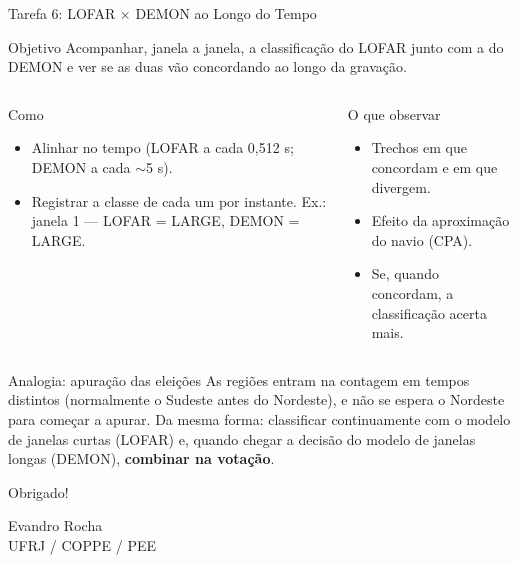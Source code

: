 \documentclass[aspectratio=169]{beamer}
\begin{document}
\begin{frame}{Tarefa 6: LOFAR $\times$ DEMON ao Longo do Tempo}
    \footnotesize
    \begin{block}{\small Objetivo}
        \scriptsize
        Acompanhar, janela a janela, a classificação do LOFAR junto com a do DEMON e ver se as duas vão concordando ao longo da gravação.
    \end{block}

    \begin{columns}[t]
        \begin{block}{\small Como}
            \scriptsize
            \begin{itemize}
                \setlength{\itemsep}{0pt}
                \item Alinhar no tempo (LOFAR a cada 0,512 s; DEMON a cada $\sim$5 s).
                \item Registrar a classe de cada um por instante. Ex.: janela 1 --- LOFAR = LARGE, DEMON = LARGE.
            \end{itemize}
        \end{block}

        \begin{block}{\small O que observar}
            \scriptsize
            \begin{itemize}
                \setlength{\itemsep}{0pt}
                \item Trechos em que concordam e em que divergem.
                \item Efeito da aproximação do navio (CPA).
                \item Se, quando concordam, a classificação acerta mais.
            \end{itemize}
        \end{block}
    \end{columns}

    \begin{alertblock}{\small Analogia: apuração das eleições}
        \scriptsize
        As regiões entram na contagem em tempos distintos (normalmente o Sudeste antes do Nordeste), e não se espera o Nordeste para começar a apurar. Da mesma forma: classificar continuamente com o modelo de janelas curtas (LOFAR) e, quando chegar a decisão do modelo de janelas longas (DEMON), \textbf{combinar na votação}.
    \end{alertblock}
\end{frame}

\begin{frame}
    \centering
    \Huge Obrigado!

    \vspace{0.8cm}
    \normalsize
    Evandro Rocha\\
    UFRJ / COPPE / PEE
\end{frame}
\end{document}
